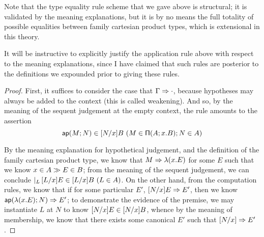 \documentclass[main.tex]{subfiles}
\begin{document}
Note that the type equality rule scheme that we gave above is structural; it is
validated by the meaning explanations, but it is by no means the full totality
of possible equalities between family cartesian product types, which is
extensional in this theory.

It will be instructive to explicitly justify the application rule above with
respect to the meaning explanations, since I have claimed that such rules are
posterior to the definitions we expounded prior to giving these rules.

\begin{proof}
First, it suffices to consider the case that $\Gamma\Rightarrow\cdot$,
because hypotheses may always be added to the context (this is called
weakening). And so, by the meaning of the sequent judgement at the
empty context, the rule amounts to the assertion
\[
  \hyp{
    \ver{\ap{M}{N}}{[N/x]B}
  }{
    \ver{M}{\typrod{A}{x}{B}}; \ver{N}{A}
  }
\]

By the meaning explanation for hypothetical judgement, and the
definition of the family cartesian product type, we know that
$M\Rightarrow\mathsf{\lambda}(x.E)$ for some $E$ such that we know
$x\in A\gg E\in B$; from the meaning of the sequent
judgement, we can conclude $\lvert_{L}\,[L/x]E\in[L/x]B\ (L\in
A)$. On the other hand, from the computation rules, we know that if
for some particular $E'$, $[N/x]E\Rightarrow E'$, then we know
$\mathsf{ap}(\mathsf{\lambda}(x.E);N)\Rightarrow E'$; to demonstrate the evidence of the
premise, we may instantiate $L$ at $N$ to know $[N/x]E\in[N/x]B$,
whence by the meaning of membership, we know that there exists some
canonical $E'$ such that $[N/x]\Rightarrow E'$.
\end{proof}
\end{document}
